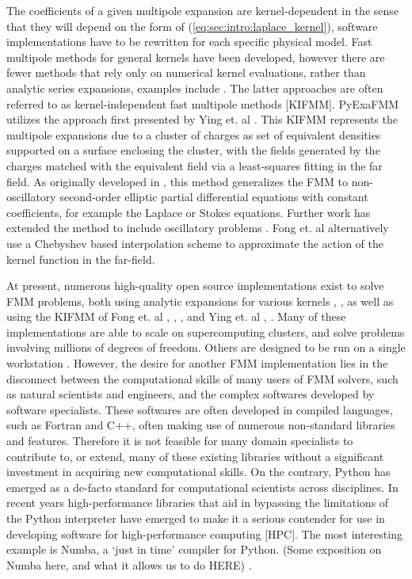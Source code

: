 \documentclass{IEEEcsmag}
\begin{document}
The coefficients of a given multipole expansion are kernel-dependent in the sense that they will depend on the form of (\ref{eq:sec:intro:laplace_kernel}), software implementations have to be rewritten for each specific physical model. Fast multipole methods for general kernels \cite{Gimbutas2003} have been developed, however there are fewer methods that rely only on numerical kernel evaluations, rather than analytic series expansions, examples include \cite{Fong2009, Ying2004,Martinsson2007}. The latter approaches are often referred to as kernel-independent fast multipole methods [KIFMM]. PyExaFMM utilizes the approach first presented by Ying et. al \cite{Ying2004}. This KIFMM represents the multipole expansions due to a cluster of charges as set of equivalent densities supported on a surface enclosing the cluster, with the fields generated by the charges matched with the equivalent field via a least-squares fitting in the far field. As originally developed in \cite{Ying2004}, this method generalizes the FMM to non-oscillatory second-order elliptic partial differential equations with constant coefficients, for example the Laplace or Stokes equations. Further work has extended the method to include oscillatory problems \cite{Engquist2007}. Fong et. al \cite{Fong2009} alternatively use a Chebyshev based interpolation scheme to approximate the action of the kernel function in the far-field.

At present, numerous high-quality open source implementations exist to solve FMM problems, both using analytic expansions for various kernels \cite{Gimbutas2010}, \cite{Yokota2017}, as well as using the KIFMM of Fong et. al \cite{Bramas2020}, \cite{Agullo2014}, \cite{Agullo2016}, and Ying et. al \cite{Wang2021}, \cite{Lashuk2012}. Many of these implementations are able to scale on supercomputing clusters, and solve problems involving millions of degrees of freedom. Others are designed to be run on a single workstation \cite{Agullo2014, Bramas2020, Wang2021}. However, the desire for another FMM implementation lies in the disconnect between the computational skills of many users of FMM solvers, such as natural scientists and engineers, and the complex softwares developed by software specialists. These softwares are often developed in compiled languages, such as Fortran and C++, often making use of numerous non-standard libraries and features. Therefore it is not feasible for many domain specialists to contribute to, or extend, many of these existing libraries without a significant investment in acquiring new computational skills. On the contrary, Python has emerged as a de-facto standard for computational scientists across disciplines. In recent years high-performance libraries that aid in bypassing the limitations of the Python interpreter have emerged to make it a serious contender for use in developing software for high-performance computing [HPC]. The most interesting example is Numba, a `just in time' compiler for Python. (Some exposition on Numba here, and what it allows us to do HERE) \cite{Lam2015}.
\end{document}
